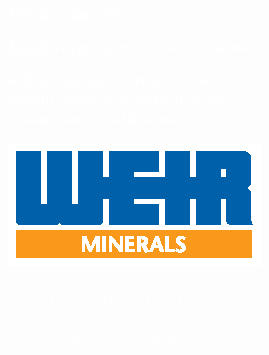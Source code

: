 \documentclass{beamer}
\newenvironment{myindentpar}[1]%
{\begin{list}{}%
         {\setlength{\leftmargin}{#1}}%
         \item[]%
}
{\end{list}}
\begin{document}
\begin{frame}[plain]

\vspace{2cm}
\begin{myindentpar}{3cm}
\textbf{\textcolor{white}{
\underline{Further questions:}
}}
\end{myindentpar}

\textbf{\textcolor{white}{
\hspace{1cm}\underline{Email:}\;\;yevgen.gorash@strath.ac.uk}}
\vspace{-0.4em}
\begin{myindentpar}{2cm}
\textbf{\textcolor{white}{
william.nicholls@strath.ac.uk\\
william.dempster@strath.ac.uk\\
r.hamilton@strath.ac.uk\\
}}
\end{myindentpar}

\vspace{1.3cm}
\includegraphics[height=0.12\paperheight]{sponsor_logo}\\
\scriptsize
\textcolor{white}{DCO Screens\\
Weir Minerals Africa (Pty) Ltd\\
31 Isando Road\\
Isando, Johannesburg, RSA}

\end{frame}
\end{document}
